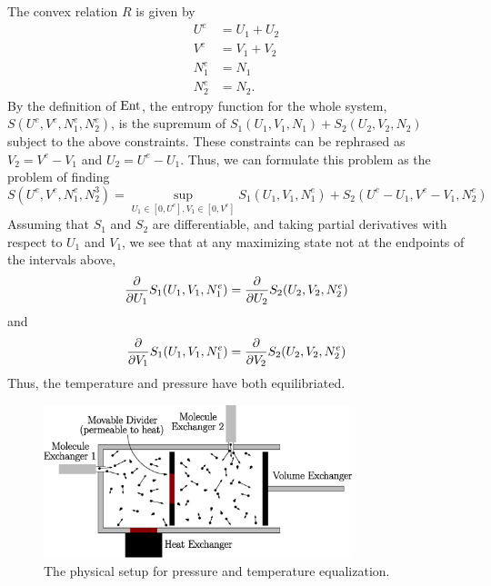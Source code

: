 \documentclass[12pt, reqno]{amsart}
\begin{document}
\begin{example}

    The convex relation $R$ is given by
    \[ \begin{array}{clcl}
        U^e &= U_1 + U_2 \\
        V^e &= V_1 + V_2 \\
        N_1^e &= N_1 \\
        N_2^e &= N_2.
    \end{array}
    \]
    By the definition of $\mathrm{Ent}$, the entropy function for the whole system, $S(U^e, V^e, N_1^e, N_2^e)$, is the supremum of $S_1(U_1, V_1, N_1) + S_2(U_2, V_2, N_2)$ subject to the above constraints. These constraints can be rephrased as $V_2 = V^e - V_1$ and $U_2 = U^e - U_1$. Thus, we can formulate this problem as the problem of finding
    \[  S(U^e,V^e,N_1^e,N_2^3) = \sup_{U_1 \in [0,U^e], V_1 \in [0,V^e]} S_1(U_1, V_1, N_1^e) + S_2(U^e - U_1, V^e - V_1, N_2^e)\]
    Assuming that $S_1$ and $S_2$ are differentiable, and taking partial derivatives with respect to $U_1$ and $V_1$, we see that at any maximizing state not at the endpoints of the intervals above,
    \[\pdv{U_1} S_1(U_1, V_1, N_1^e) = \pdv{U_2} S_2(U_2, V_2, N_2^e) \]
    and 
    \[\pdv{V_1} S_1(U_1, V_1, N_1^e) = \pdv{V_2} S_2(U_2, V_2, N_2^e) \]
    Thus, the temperature and pressure have both equilibriated.
\end{example}

\begin{figure}
    \centering
    \includegraphics[width=0.8\textwidth]{figures/two_ideal_gases.eps}
    \caption{The physical setup for pressure and temperature equalization.}
    \label{fig:two_ideal_gases}
\end{figure}
\end{document}
